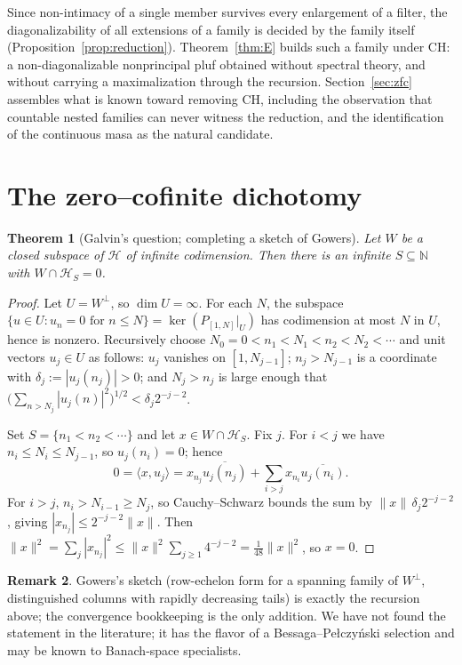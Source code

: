 \documentclass[11pt,reqno]{amsart}
\newtheorem{theorem}{Theorem}[section]
\theoremstyle{definition}
\newtheorem{remark}[theorem]{Remark}
\newcommand{\HH}{\mathcal{H}}
\newcommand{\N}{\mathbb{N}}
\begin{document}
Since non-intimacy of a single member survives every enlargement of a filter, the
diagonalizability of all extensions of a family is decided by the family itself
(Proposition~\ref{prop:reduction}). Theorem~\ref{thm:E} builds such a family under CH:
a non-diagonalizable nonprincipal pluf obtained without spectral theory, and without
carrying a maximalization through the recursion. Section~\ref{sec:zfc} assembles what is known toward removing CH,
including the observation that countable nested families can never witness the
reduction, and the identification of the continuous masa as the natural candidate.

\section{The zero--cofinite dichotomy}\label{sec:dichotomy}

\begin{theorem}[Galvin's question; completing a sketch of Gowers]\label{thm:A}
Let $W$ be a closed subspace of $\HH$ of infinite codimension. Then there is an infinite
$S\subseteq\N$ with $W\cap\HH_S=0$.
\end{theorem}

\begin{proof}
Let $U=W^\perp$, so $\dim U=\infty$. For each $N$, the subspace
$\{u\in U:u_n=0\text{ for }n\le N\}=\ker(P_{[1,N]}|_U)$ has codimension at most $N$ in
$U$, hence is nonzero. Recursively choose $N_0=0<n_1<N_1<n_2<N_2<\cdots$ and unit
vectors $u_j\in U$ as follows: $u_j$ vanishes on $[1,N_{j-1}]$; $n_j>N_{j-1}$ is a
coordinate with $\delta_j:=|u_j(n_j)|>0$; and $N_j>n_j$ is large enough that
$\bigl(\sum_{n>N_j}|u_j(n)|^2\bigr)^{1/2}<\delta_j2^{-j-2}$.

Set $S=\{n_1<n_2<\cdots\}$ and let $x\in W\cap\HH_S$. Fix $j$. For $i<j$ we have
$n_i\le N_i\le N_{j-1}$, so $u_j(n_i)=0$; hence
\[
0=\langle x,u_j\rangle
 =x_{n_j}\overline{u_j(n_j)}+\sum_{i>j}x_{n_i}\overline{u_j(n_i)}.
\]
For $i>j$, $n_i>N_{i-1}\ge N_j$, so Cauchy--Schwarz bounds the sum by
$\|x\|\,\delta_j2^{-j-2}$, giving $|x_{n_j}|\le2^{-j-2}\|x\|$. Then
$\|x\|^2=\sum_j|x_{n_j}|^2\le\|x\|^2\sum_{j\ge1}4^{-j-2}=\tfrac1{48}\|x\|^2$, so $x=0$.
\end{proof}

\begin{remark}
Gowers's sketch (row-echelon form for a spanning family of $W^\perp$, distinguished
columns with rapidly decreasing tails) is exactly the recursion above; the convergence
bookkeeping is the only addition. We have not found the statement in the literature; it
has the flavor of a Bessaga--Pe{\l}czy\'nski selection and may be known to Banach-space
specialists.
\end{remark}
\end{document}

